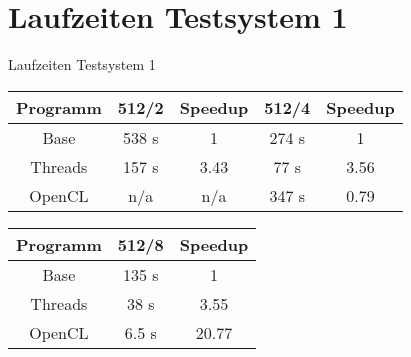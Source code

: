 \documentclass{beamer}
\begin{document}
\section{Laufzeiten Testsystem 1}
\begin{frame}{Laufzeiten Testsystem 1}
    \begin{table}[]
        \centering
        \begin{tabular}{|c|c|c|c|c|}
            \hline
            \textbf{Programm} & \textbf{512/2} & \textbf{Speedup} & \textbf{512/4} & \textbf{Speedup} \\ \hline
            Base & 538 s & 1 & 274 s & 1 \\ \hline
            Threads & 157 s & 3.43 & 77 s & 3.56 \\ \hline
            OpenCL & n/a & n/a & 347 s & 0.79 \\ \hline
        \end{tabular}
    \end{table}
    \begin{table}[]
        \centering
        \begin{tabular}{|c|c|c|}
            \hline
            \textbf{Programm} & \textbf{512/8} & \textbf{Speedup} \\ \hline
            Base & 135 s & 1 \\ \hline
            Threads & 38 s & 3.55 \\ \hline
            OpenCL & 6.5 s & 20.77 \\ \hline
        \end{tabular}
    \end{table}
\end{frame}
\end{document}
